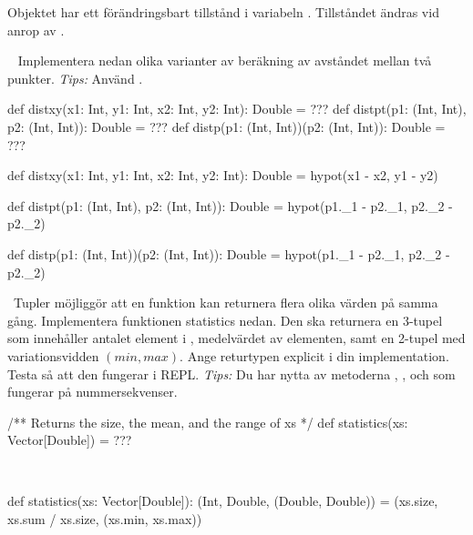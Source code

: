 \SubtaskSolved  Objektet  har ett förändringsbart tillstånd i variabeln . Tillståndet ändras vid anrop av .

\QUESTEND



\QUESTBEGIN

\Task  \what~ Implementera nedan olika varianter av beräkning av avståndet mellan två punkter. \emph{Tips:} Använd .
\begin{Code}
def distxy(x1: Int, y1: Int, x2: Int, y2: Int): Double = ???
def distpt(p1: (Int, Int), p2: (Int, Int)):     Double = ???
def distp(p1: (Int, Int))(p2: (Int, Int)):      Double = ???

\end{Code}

\SOLUTION

\TaskSolved \what

\begin{Code}
def distxy(x1: Int, y1: Int, x2: Int, y2: Int): Double =
  hypot(x1 - x2, y1 - y2)

def distpt(p1: (Int, Int), p2: (Int, Int)): Double =
  hypot(p1._1 - p2._1, p2._2 - p2._2)

def distp(p1: (Int, Int))(p2: (Int, Int)): Double =
  hypot(p1._1 - p2._1, p2._2 - p2._2)
\end{Code}

\QUESTEND



\QUESTBEGIN

\Task \what~Tupler möjliggör att en funktion kan returnera flera olika värden på samma gång. Implementera funktionen statistics nedan. Den ska returnera en 3-tupel som innehåller antalet element i , medelvärdet av elementen, samt en 2-tupel med variationsvidden $(min, max)$. Ange returtypen explicit i din implementation. Testa så att den fungerar i REPL. \emph{Tips:} Du har nytta av metoderna , ,  och  som fungerar på nummersekvenser.

\begin{Code}
/** Returns the size, the mean, and the range of xs */
def statistics(xs: Vector[Double]) = ???
\end{Code}

\SOLUTION

\TaskSolved \what~

\begin{Code}
def statistics(xs: Vector[Double]): (Int, Double, (Double, Double)) =
  (xs.size, xs.sum / xs.size, (xs.min, xs.max))
\end{Code}

